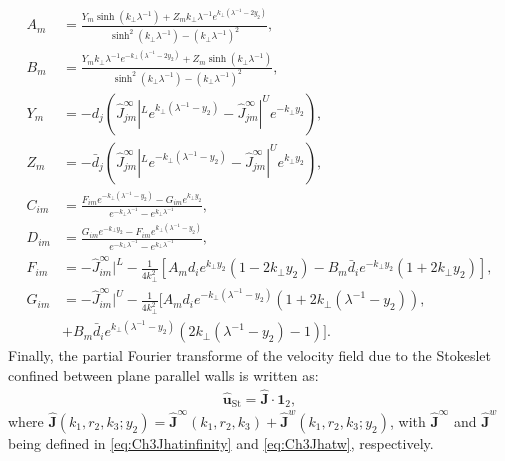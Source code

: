 \documentclass{jfm}
\begin{document}
\begin{align}
A_m&=\frac{Y_m \sinh (k_\perp\lambda^{-1})+Z_m k_\perp\lambda^{-1}e^{k_\perp(\lambda^{-1}-2 y_2)}}{\sinh^2 (k_\perp\lambda^{-1})-(k_\perp\lambda^{-1})^2},\\
B_m&=\frac{Y_m k_\perp\lambda^{-1} e^{-k_\perp(\lambda^{-1}-2y_2)}+ Z_m \sinh (k_\perp\lambda^{-1})}{\sinh^2 (k_\perp\lambda^{-1})-(k_\perp\lambda^{-1})^2},\\
Y_m&=-d_j(\hat{J}^\infty_{jm}|^L e^{k_\perp(\lambda^{-1}-y_2)}-\hat{J}^\infty_{jm}|^U e^{-k_\perp y_2}),\\
Z_m&=-\bar{d}_j(\hat{J}^\infty_{jm}|^L e^{-k_\perp (\lambda^{-1}-y_2)}-\hat{J}^\infty_{jm}|^U e^{k_\perp y_2}),\\
C_{im}&=\frac{F_{im}e^{-k_\perp(\lambda^{-1}-y_2)}-G_{im}e^{k_\perp y_2}}{e^{-k_\perp\lambda^{-1}}-e^{k_\perp\lambda^{-1}}},\\
D_{im}&=\frac{G_{im}e^{-k_\perp y_2}-F_{im}e^{k_\perp(\lambda^{-1}-y_2)}}{e^{-k_\perp\lambda^{-1}}-e^{k_\perp\lambda^{-1}}},\\
F_{im}&=-\hat{J}^\infty_{im}|^L-\frac{1}{4k_\perp^2}[A_m d_i e^{k_\perp y_2}(1-2k_\perp y_2)-B_m\bar{d}_i e^{-k_\perp y_2}(1+2k_\perp y_2)],\\
G_{im}&=-\hat{J}^\infty_{im}|^U-\frac{1}{4k_\perp^2}[A_m d_i e^{-k_\perp(\lambda^{-1}-y_2)}(1+2k_\perp(\lambda^{-1}-y_2)),\nonumber\\
&+B_m\bar{d}_i e^{k_\perp(\lambda^{-1}-y_2)}(2k_\perp(\lambda^{-1}-y_2)-1)].
\end{align}
Finally, the partial Fourier transforme of the velocity field due to the Stokeslet confined between plane parallel walls is written as:
\begin{align}
\hat{\bm{u}}_{\text{St}}=\hat{\bm{J}}\cdot\bm{1}_2,
\label{eq:Ch3BoundedStokesletfield}
\end{align}
where $\hat{\bm{J}}(k_1,r_2,k_3;y_2)=\hat{\bm{J}}^\infty(k_1,r_2,k_3) +\hat{\bm{J}}^w(k_1,r_2,k_3;y_2)$, with $\hat{\bm{J}}^\infty$ and $\hat{\bm{J}}^w$ being defined in \eqref{eq:Ch3Jhatinfinity} and \eqref{eq:Ch3Jhatw}, respectively.
\end{document}
